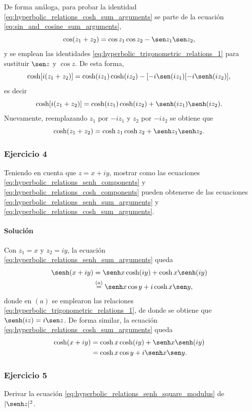 \documentclass[a4paper]{report}
\begin{document}
De forma análoga, para probar la identidad \ref{eq:hyperbolic_relations_cosh_sum_arguments} se parte de la ecuación \ref{eq:sin_and_cosine_sum_arguments},
\[
 \cos(z_1+z_2)=\cos z_1\cos z_2-\sen z_1\sen z_2,
\]
y se emplean las identidades \ref{eq:hyperbolic_trigonometric_relations_1} para sustituir \(\sen z\) y \(\cos z\). De esta forma,
\[
 \cosh[i(z_1+z_2)]=\cosh(iz_1)\cosh(iz_2)-[-i\sen(iz_1)[-i\senh(iz_2)],
\]
es decir
\[
 \cosh[i(z_1+z_2)]=\cosh(iz_1)\cosh(iz_2)+\senh(iz_1)\senh(iz_2).
\]
Nuevamente, reemplazando \(z_1\) por \(-iz_1\) y \(z_2\) por \(-iz_2\) se obtiene que 
\[
 \cosh(z_1+z_2)=\cosh z_1\cosh z_2+\senh z_1\senh z_2.
\]

\subsubsection{Ejercicio 4}

Teniendo en cuenta que \(z=x+iy\), mostrar como las ecuaciones \ref{eq:hyperbolic_relations_senh_components} y \ref{eq:hyperbolic_relations_cosh_components} pueden obtenerse de las ecuaciones \ref{eq:hyperbolic_relations_senh_sum_arguments} y \ref{eq:hyperbolic_relations_cosh_sum_arguments}.

\paragraph{Solución} Con \(z_1=x\) y \(z_2=iy\), la ecuación \ref{eq:hyperbolic_relations_senh_sum_arguments} queda
\begin{align*}
 \senh(x+iy)&=\senh x\cosh(iy)+\cosh x\senh(iy)\\
   &\overset{(a)}{=}\senh x\cos y+i\cosh x\sen y,
\end{align*}
donde en \((a)\) se emplearon las relaciones \ref{eq:hyperbolic_trigonometric_relations_1}, de donde se obtiene que \(\senh(iz)=i\sen z\). De forma similar, la ecuación \ref{eq:hyperbolic_relations_cosh_sum_arguments} queda
\begin{align*}
 \cosh(x+iy)&=\cosh x\cosh(iy)+\senh x\senh(iy)\\
   &=\cosh x\cos y+i\senh x\sen y.
\end{align*} 

\subsubsection{Ejercicio 5}

Derivar la ecuación \ref{eq:hyperbolic_relations_senh_square_modulus} de \(|\senh z|^2\).
\end{document}
